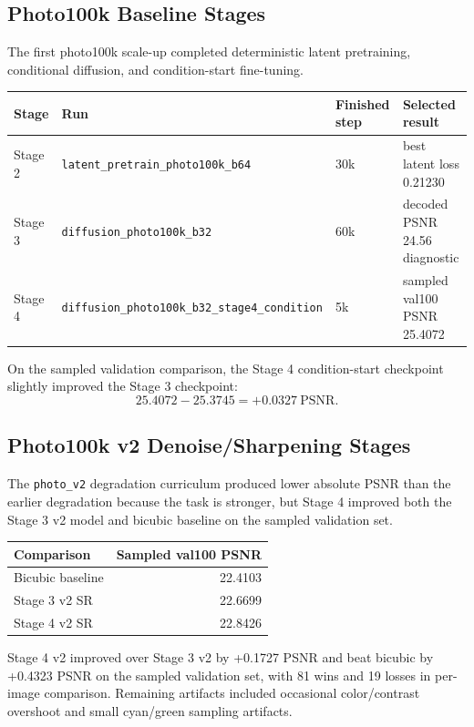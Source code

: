 \documentclass[10pt]{article}
\begin{document}
\subsection{Photo100k Baseline Stages}

The first photo100k scale-up completed deterministic latent pretraining,
conditional diffusion, and condition-start fine-tuning.

\begin{table}[H]
\centering
\begin{tabular}{llll}
\toprule
Stage & Run & Finished step & Selected result \\
\midrule
Stage 2 & \texttt{latent\_pretrain\_photo100k\_b64} & 30k &
best latent loss 0.21230 \\
Stage 3 & \texttt{diffusion\_photo100k\_b32} & 60k &
decoded PSNR 24.56 diagnostic \\
Stage 4 & \texttt{diffusion\_photo100k\_b32\_stage4\_condition} & 5k &
sampled val100 PSNR 25.4072 \\
\bottomrule
\end{tabular}
\end{table}

On the sampled validation comparison, the Stage 4 condition-start checkpoint
slightly improved the Stage 3 checkpoint:
\[
25.4072 - 25.3745 = +0.0327\ \mathrm{PSNR}.
\]

\subsection{Photo100k v2 Denoise/Sharpening Stages}

The \texttt{photo\_v2} degradation curriculum produced lower absolute PSNR than
the earlier degradation because the task is stronger, but Stage 4 improved both
the Stage 3 v2 model and bicubic baseline on the sampled validation set.

\begin{table}[H]
\centering
\begin{tabular}{lr}
\toprule
Comparison & Sampled val100 PSNR \\
\midrule
Bicubic baseline & 22.4103 \\
Stage 3 v2 SR & 22.6699 \\
Stage 4 v2 SR & 22.8426 \\
\bottomrule
\end{tabular}
\end{table}

Stage 4 v2 improved over Stage 3 v2 by +0.1727 PSNR and beat bicubic by +0.4323
PSNR on the sampled validation set, with 81 wins and 19 losses in per-image
comparison. Remaining artifacts included occasional color/contrast overshoot and
small cyan/green sampling artifacts.
\end{document}
